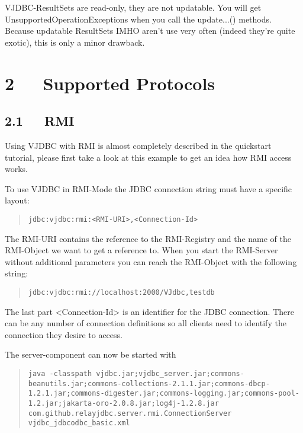 \documentclass[10pt,a4paper,english]{article}
\begin{document}
VJDBC-ResultSets are read-only, they are not updatable. You will get UnsupportedOperationExceptions when you call the update...() methods. Because updatable ResultSets IMHO aren't use very often (indeed they're quite exotic), this is only a minor drawback.



\hypertarget{supported-protocols}{}
\section*{2~~~Supported Protocols}



\hypertarget{rmi}{}
\subsection*{2.1~~~RMI}

Using VJDBC with RMI is almost completely described in the quickstart tutorial, please first take a look at this example to get an idea how RMI access works.

To use VJDBC in RMI-Mode the JDBC connection string must have a specific layout:
\begin{quote}

\texttt{jdbc:vjdbc:rmi:<RMI-URI>,<Connection-Id>}
\end{quote}

The RMI-URI contains the reference to the RMI-Registry and the name of the RMI-Object we want to get a reference to. When you start the RMI-Server without additional parameters you can reach the RMI-Object with the following string:
\begin{quote}

\texttt{jdbc:vjdbc:rmi://localhost:2000/VJdbc,testdb}
\end{quote}

The last part {\textless}Connection-Id{\textgreater} is an identifier for the JDBC connection. There can be any number of connection definitions so all clients need to identify the connection they desire to access.

The server-component can now be started with
\begin{quote}

\texttt{java -classpath vjdbc.jar;vjdbc{\_}server.jar;commons-beanutils.jar;commons-collections-2.1.1.jar;commons-dbcp-1.2.1.jar;commons-digester.jar;commons-logging.jar;commons-pool-1.2.jar;jakarta-oro-2.0.8.jar;log4j-1.2.8.jar com.github.relayjdbc.server.rmi.ConnectionServer vjdbc{\_}jdbcodbc{\_}basic.xml}
\end{quote}
\end{document}
